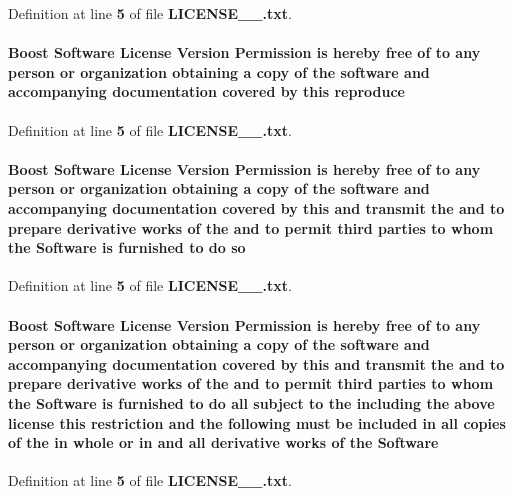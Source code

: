 Definition at line {\bf 5} of file {\bf L\+I\+C\+E\+N\+S\+E\+\_\+\_.\+txt}.

\paragraph[{reproduce}]{\setlength{\rightskip}{0pt plus 5cm}Boost {\bf Software} License Version Permission is hereby free of to any person or organization obtaining a copy of the software and accompanying documentation covered by this reproduce}\label{LICENSE__1__0_8txt_aa76fd25bb5d9a82f351c0188325ddf19}


Definition at line {\bf 5} of file {\bf L\+I\+C\+E\+N\+S\+E\+\_\+\_.\+txt}.

\paragraph[{so}]{\setlength{\rightskip}{0pt plus 5cm}Boost {\bf Software} License Version Permission is hereby free of to any person or organization obtaining a copy of the software and accompanying documentation covered by this and transmit the and to prepare derivative works of the and to permit third parties to whom the {\bf Software} is furnished to do so}\label{LICENSE__1__0_8txt_a45dcdfe4df5baa1d8c3683eb8705c61a}


Definition at line {\bf 5} of file {\bf L\+I\+C\+E\+N\+S\+E\+\_\+\_.\+txt}.

\paragraph[{Software}]{\setlength{\rightskip}{0pt plus 5cm}Boost Software License Version Permission is hereby free of to any person or organization obtaining a copy of the software and accompanying documentation covered by this and transmit the and to prepare derivative works of the and to permit third parties to whom the Software is furnished to do {\bf all} subject to the including the above {\bf license} this restriction and the {\bf following} must be included in {\bf all} copies of the in whole or in and {\bf all} derivative works of the Software}\label{LICENSE__1__0_8txt_ace9c60d08acfe96bcb75cdf43fa5e678}


Definition at line {\bf 5} of file {\bf L\+I\+C\+E\+N\+S\+E\+\_\+\_.\+txt}.

